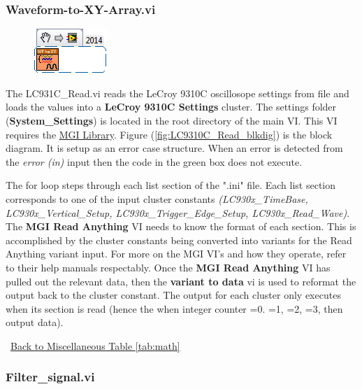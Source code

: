 \documentclass[11pt,a4paper,oldfontcommands]{memoir}
\begin{document}
\subsubsection{Waveform-to-XY-Array.vi} \label{Waveform-to-XY-Array}
\noindent\hrulefill

\begin{figure}[h]
	\includegraphics[scale=0.625]{Waveform-to-XY-Array_main_01}
	\label{fig:Waveform-to-XY-Array_main_01}
\end{figure}

The LC931C\_Read.vi reads the LeCroy 9310C oscillosope settings from file and loads the values into a \textbf{LeCroy 9310C Settings} cluster. The settings folder (\textbf{System\_Settings}) is located in the root directory of the main VI. This VI requires the \href{http://sine.ni.com/nips/cds/view/p/lang/en/nid/209753}{MGI Library}. Figure (\ref{fig:LC9310C_Read_blkdig}) is the block diagram.  It is setup as an error case structure. When an error is detected from the \textit{error (in)} input then the code in the green box does not execute.

The for loop steps through each list section of the ".ini" file. Each list section corresponds to one of the input cluster constants \textit{(LC930x\_TimeBase, LC930x\_Vertical\_Setup, LC930x\_Trigger\_Edge\_Setup, LC930x\_Read\_Wave)}. The \textbf{MGI Read Anything} VI needs to know the format of each section. This is accomplished by the cluster constants being converted into variants for the Read Anything variant input.  For more on the MGI VI's and how they operate, refer to their help manuals respectably. Once the \textbf{MGI Read Anything} VI has pulled out the relevant data, then the \textbf{variant to data} vi is used to reformat the output back to the cluster constant. The output for each cluster only executes when its section is read (hence the when integer counter =0. =1, =2, =3, then output data).

\noindent\hrulefill\, \hyperref[tab:math]{Back to Miscellaneous Table \ref{tab:math}}

\subsubsection{Filter\_signal.vi} \label{Filter_signal}
\noindent\hrulefill
\end{document}
